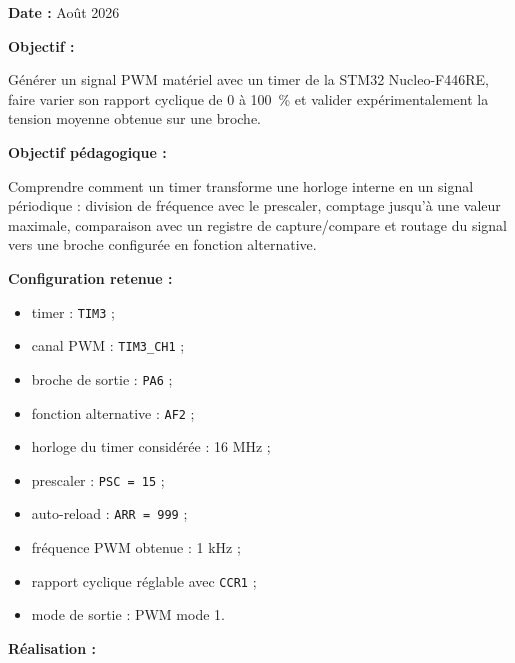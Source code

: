 \documentclass[11pt,a4paper]{article}
\begin{document}
	\begin{sessionbox}
		
		\textbf{Date :} Août 2026
		
		\vspace{0.3cm}
		
		\textbf{Objectif :}
		
		Générer un signal PWM matériel avec un timer de la STM32 Nucleo-F446RE, faire varier son rapport cyclique de 0 à 100~\% et valider expérimentalement la tension moyenne obtenue sur une broche.
		
		\vspace{0.3cm}
		
		\textbf{Objectif pédagogique :}
		
		Comprendre comment un timer transforme une horloge interne en un signal périodique : division de fréquence avec le prescaler, comptage jusqu'à une valeur maximale, comparaison avec un registre de capture/compare et routage du signal vers une broche configurée en fonction alternative.
		
		\vspace{0.3cm}
		
		\textbf{Configuration retenue :}
		
		\begin{itemize}
			\item timer : \texttt{TIM3} ;
			\item canal PWM : \texttt{TIM3\_CH1} ;
			\item broche de sortie : \texttt{PA6} ;
			\item fonction alternative : \texttt{AF2} ;
			\item horloge du timer considérée : 16 MHz ;
			\item prescaler : \texttt{PSC = 15} ;
			\item auto-reload : \texttt{ARR = 999} ;
			\item fréquence PWM obtenue : 1 kHz ;
			\item rapport cyclique réglable avec \texttt{CCR1} ;
			\item mode de sortie : PWM mode 1.
		\end{itemize}
		
		\vspace{0.3cm}
		
		\textbf{Réalisation :}
		

\end{sessionbox}
\end{document}
